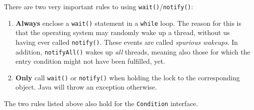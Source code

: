 \documentclass[main]{subfiles}
\begin{document}
There are two very important rules to using \texttt{wait()}/\texttt{notify()}:
\begin{enumerate}
    \item \textbf{Always} enclose a \texttt{wait()} statement in a \texttt{while} loop. The reason for this is that the operating system may randomly wake up a thread, without us having ever called \texttt{notify()}. These events are called \textit{spurious wakeups}. In addition, \texttt{notifyAll()} wakes up \textit{all} threads, meaning also those for which the entry condition might not have been fulfilled, yet.
    \item \textbf{Only} call \texttt{wait()} or \texttt{notify()} when holding the lock to the corresponding object. Java will throw an exception otherwise.
\end{enumerate}
The two rules listed above also hold for the \texttt{Condition} interface.
\end{document}
